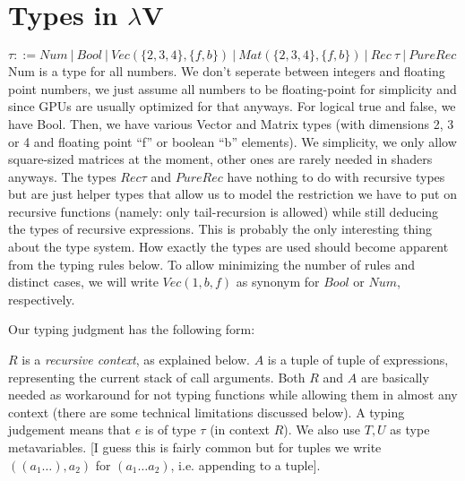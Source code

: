 \documentclass[letterpaper,12pt]{article}
\begin{document}
\section{Types in $\lambda$V}

$\tau ::= Num \:|\: 
	Bool \:|\: 
	Vec(\{2, 3, 4\}, \{f, b\}) \:|\: 
	Mat(\{2, 3, 4\}, \{f, b\}) \:|\: 
	Rec\:\tau \:|\: 
	PureRec$ \\

Num is a type for all numbers. We don't seperate between integers and floating
point numbers, we just assume all numbers to be floating-point for simplicity
and since GPUs are usually optimized for that anyways. For logical true and
false, we have Bool. Then, we have various Vector and Matrix types (with
dimensions 2, 3 or 4 and floating point ``f'' or boolean ``b'' elements).
We simplicity, we only allow square-sized matrices at the moment, other
ones are rarely needed in shaders anyways. 
The types $Rec \tau$ and $PureRec$ have nothing to do with
recursive types but are just helper types that
allow us to model the restriction we have to put on recursive functions
(namely: only tail-recursion is allowed) while still deducing the types of
recursive expressions. This is probably the only interesting thing about
the type system. How exactly the types are used should become apparent from
the typing rules below.
To allow minimizing the number of rules and distinct cases, we will
write $Vec(1, {b,f})$ as synonym for $Bool$ or $Num$, respectively.

Our typing judgment has the following form: \\
\begin{center}
\end{center}

$R$ is a \textit{recursive context}, as explained below.
$A$ is a tuple of tuple of expressions, representing the current
stack of call arguments.
Both $R$ and $A$ are basically needed as workaround for not typing
functions while allowing them in almost any context (there are some
technical limitations discussed below).
A typing judgement means that $e$ is of type $\tau$ (in context $R$).
We also use $T, U$ as type metavariables.
[I guess this is fairly common but for tuples we write $((a_1 \dots), a_2)$
for $(a_1 \dots a_2)$, i.e. appending to a tuple].
\end{document}
